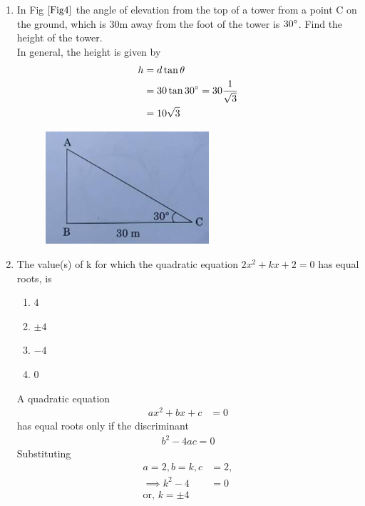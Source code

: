\documentclass[journal,12pt,twocolumn]{IEEEtran}
\begin{document}
\begin{enumerate}
\begin{enumerate}
\end{enumerate}
\item In Fig $\ref{Fig4}$ the angle of elevation from the top of a tower from a point C on the ground, which is 30m away from the foot of the tower is $30\degree$. Find the height of the tower.\\
	\solution In general, the height is given by 
  \begin{align}
	  h &= d \tan \theta
	  \\
	  &= 30 \tan 30 \degree = 30 \frac{1}{\sqrt{3}}
	  \\
	  &= 10 \sqrt{3}
  \end{align}

\begin{figure}[h!]
    \centering
    \includegraphics[width=0.5\columnwidth]{Fig4.png}
	\caption{}
	\label{Fig4}
 \end{figure}
\item The value(s) of k for which the quadratic equation $2x^2 + kx + 2 = 0$ has equal roots, is
\begin{enumerate}
    \item $4$
    \item $\pm 4$
    \item $- 4$\
    \item $0$
\end{enumerate}
\solution 
A quadratic equation 
		\begin{align}
			ax^2+bx + c  &= 0
		\end{align}
		has equal roots only if 
 the discriminant
		\begin{align}
			b^2 - 4a c  = 0
		\end{align}
		Substituting
		\begin{align}
			a = 2, b = k, c &= 2,
			\\
\implies 			k^2 - 4 &= 0
			\\
			\text{or, }k = \pm 4
		\end{align}


\end{enumerate}
\end{document}
